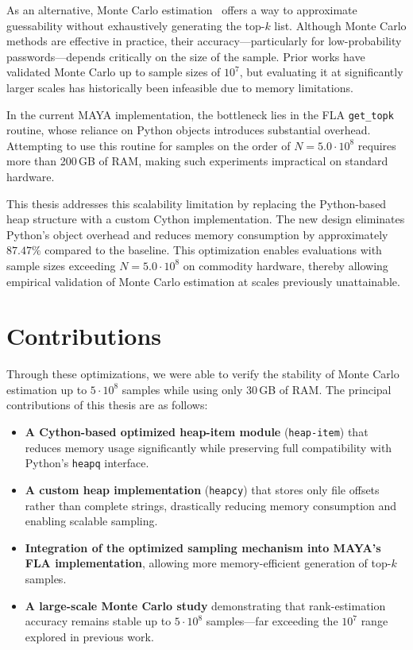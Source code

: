 \documentclass[english,noexaminfo,a4paper,oneside, binding = 0.6cm]{sapthesis}
\begin{document}
As an alternative, Monte Carlo estimation~\cite{ref:dellamico} offers a way to approximate guessability without exhaustively generating the top-$k$ list. Although Monte Carlo methods are effective in practice, their accuracy—particularly for low-probability passwords—depends critically on the size of the sample. Prior works have validated Monte Carlo up to sample sizes of $10^7$, but evaluating it at significantly larger scales has historically been infeasible due to memory limitations.

In the current MAYA implementation, the bottleneck lies in the FLA \texttt{get\_topk} routine, whose reliance on Python objects introduces substantial overhead. Attempting to use this routine for samples on the order of $N=5.0 \cdot 10^8$ requires more than 200\,GB of RAM, making such experiments impractical on standard hardware.

This thesis addresses this scalability limitation by replacing the Python-based heap structure with a custom Cython implementation. The new design eliminates Python’s object overhead and reduces memory consumption by approximately $87.47\%$ compared to the baseline. This optimization enables evaluations with sample sizes exceeding $N=5.0 \cdot 10^8$ on commodity hardware, thereby allowing empirical validation of Monte Carlo estimation at scales previously unattainable.

\section{Contributions}
Through these optimizations, we were able to verify the stability of Monte Carlo estimation up to $5 \cdot 10^8$ samples while using only 30\,GB of RAM. The principal contributions of this thesis are as follows:

\begin{itemize}
    \item \textbf{A Cython-based optimized heap-item module} (\texttt{heap-item}) that reduces memory usage significantly while preserving full compatibility with Python's \texttt{heapq} interface.
    \item \textbf{A custom heap implementation} (\texttt{heapcy}) that stores only file offsets rather than complete strings, drastically reducing memory consumption and enabling scalable sampling.
    \item \textbf{Integration of the optimized sampling mechanism into MAYA’s FLA implementation}, allowing more memory-efficient generation of top-$k$ samples.
    \item \textbf{A large-scale Monte Carlo study} demonstrating that rank-estimation accuracy remains stable up to $5 \cdot 10^8$ samples—far exceeding the $10^7$ range explored in previous work.
\end{itemize}
\end{document}
